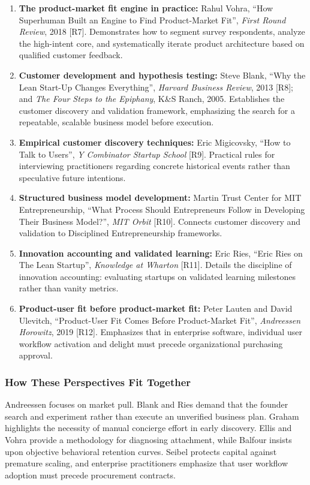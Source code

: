 \begin{enumerate}
    \item \textbf{The product-market fit engine in practice:} Rahul Vohra, ``How Superhuman Built an Engine to Find Product-Market Fit'', \emph{First Round Review}, 2018 [R7]. Demonstrates how to segment survey respondents, analyze the high-intent core, and systematically iterate product architecture based on qualified customer feedback.
    \item \textbf{Customer development and hypothesis testing:} Steve Blank, ``Why the Lean Start-Up Changes Everything'', \emph{Harvard Business Review}, 2013 [R8]; and \emph{The Four Steps to the Epiphany}, K\&S Ranch, 2005. Establishes the customer discovery and validation framework, emphasizing the search for a repeatable, scalable business model before execution.
    \item \textbf{Empirical customer discovery techniques:} Eric Migicovsky, ``How to Talk to Users'', \emph{Y Combinator Startup School} [R9]. Practical rules for interviewing practitioners regarding concrete historical events rather than speculative future intentions.
    \item \textbf{Structured business model development:} Martin Trust Center for MIT Entrepreneurship, ``What Process Should Entrepreneurs Follow in Developing Their Business Model?'', \emph{MIT Orbit} [R10]. Connects customer discovery and validation to Disciplined Entrepreneurship frameworks.
    \item \textbf{Innovation accounting and validated learning:} Eric Ries, ``Eric Ries on The Lean Startup'', \emph{Knowledge at Wharton} [R11]. Details the discipline of innovation accounting: evaluating startups on validated learning milestones rather than vanity metrics.
    \item \textbf{Product-user fit before product-market fit:} Peter Lauten and David Ulevitch, ``Product-User Fit Comes Before Product-Market Fit'', \emph{Andreessen Horowitz}, 2019 [R12]. Emphasizes that in enterprise software, individual user workflow activation and delight must precede organizational purchasing approval.
\end{enumerate}

\subsubsection*{How These Perspectives Fit Together}

Andreessen focuses on market pull. Blank and Ries demand that the founder search and experiment rather than execute an unverified business plan. Graham highlights the necessity of manual concierge effort in early discovery. Ellis and Vohra provide a methodology for diagnosing attachment, while Balfour insists upon objective behavioral retention curves. Seibel protects capital against premature scaling, and enterprise practitioners emphasize that user workflow adoption must precede procurement contracts.

